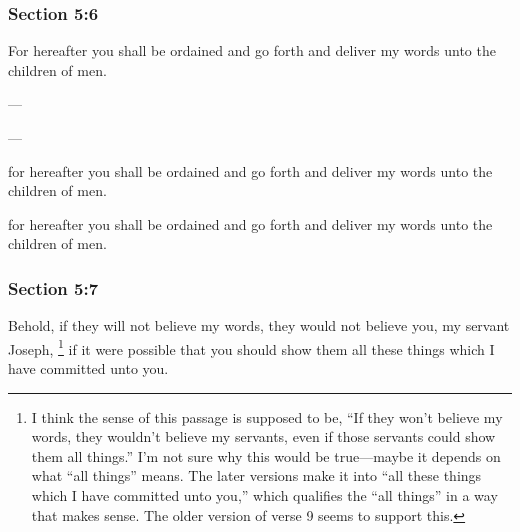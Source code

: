 	\subsubsection{Section 5:6} %
		\label{DC5-6}

		For hereafter you shall be ordained and go forth and deliver my words unto the children of men.

		\begin{framed}
		\scriptsize
			\begin{compactdesc}
				\item[JSP] ---
				\item[RB1] [\textit{missing}]
				\item[BC] ---
				\item[DC 1835] for hereafter you shall be ordained and go forth and deliver my words unto the children of men.
				\item[DC 1844] for hereafter you shall be ordained and go forth and deliver my words unto the children of men.
			\end{compactdesc}
		\end{framed}

	\subsubsection{Section 5:7} %
		\label{DC5-7}

		Behold, if they will not believe my words, they would not believe you, my servant Joseph,
			\footnote{%
				I think the sense of this passage is supposed to be, ``If they won't believe my words, they wouldn't believe my servants, even if those servants could show them all things.'' I'm not sure why this would be true---maybe it depends on what ``all things'' means. The later versions make it into ``all these things which I have committed unto you,'' which qualifies the ``all things'' in a way that makes sense. The older version of verse 9 seems to support this.
				}%
		if it were possible that you should show them all these things which I have committed unto you.

